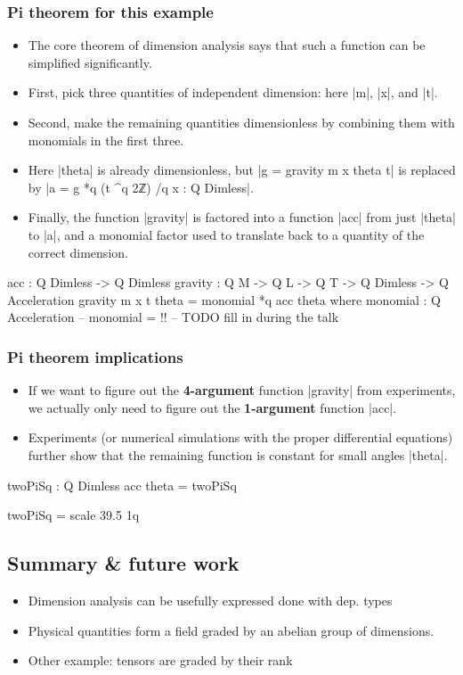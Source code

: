 \documentclass{article}
\begin{document}
\subsubsection{Pi theorem for this example}
\label{sec:org4a22469}
\begin{itemize}
\item The core theorem of dimension analysis says that such a function can
be simplified significantly.
\item First, pick three quantities of independent dimension:
here |m|, |x|, and |t|.
\item Second, make the remaining quantities dimensionless by combining
them with monomials in the first three.
\item Here |theta| is already dimensionless, but |g = gravity m x theta t|
is replaced by |a = g *q (t ^q 2ℤ) /q x : Q Dimless|.
\item Finally, the function |gravity| is factored into a function |acc|
from just |theta| to |a|, and a monomial factor used to translate
back to a quantity of the correct dimension.
\end{itemize}
\begin{code}
  acc : Q Dimless -> Q Dimless
  gravity : Q M -> Q L -> Q T -> Q Dimless -> Q Acceleration
  gravity m x t theta = monomial  *q  acc theta
    where  monomial : Q Acceleration --
           monomial = {!!} -- TODO fill in during the talk
\end{code}
\subsubsection{Pi theorem implications}
\label{sec:orgb2d1435}
\begin{itemize}
\item If we want to figure out the \textbf{4-argument} function |gravity| from
experiments, we actually only need to figure out the \textbf{1-argument}
function |acc|.
\item Experiments (or numerical simulations with the proper differential
equations) further show that the remaining function is constant for
small angles |theta|.
\end{itemize}

\begin{code}
  twoPiSq : Q Dimless
  acc theta = twoPiSq

  twoPiSq = scale 39.5 1q
\end{code}

\subsection{Summary \& future work}
\label{sec:org51e8638}
\begin{itemize}
\item Dimension analysis can be usefully expressed done with dep. types
\item Physical quantities form a field graded by an abelian group of
dimensions.
\item Other example: tensors are graded by their rank
\end{itemize}
\end{document}
